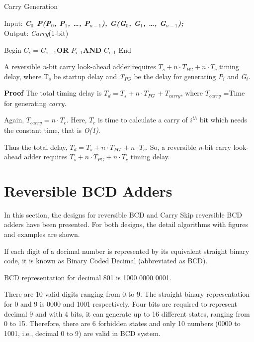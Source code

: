 \begin{algorithm}[!tbh]
	\caption{Carry Generation}
	\label{alg:part1_c2_alg5}
	Input: {\bf {\it C${}_{0,\ }$P(P${}_{0}$, P${}_{1}$, {\dots}, P${}_{n-1}$), G(G${}_{0}$, G${}_{1}$, {\dots}, G${}_{n-1}$);}}\\
	Output: {{ \textit{Carry}(1-bit)}}
	\begin{algorithmic}[1]
		\STATE Begin
		\STATE $C{}_{i}$ = $G{}_{i-1}${\bf OR} $P{}_{i\cdot 1}${\bf AND} $C{}_{i\cdot 1}$
		\ENDFOR
		\STATE End
	\end{algorithmic}
\end{algorithm}
\begin{property}\textnormal{
		A reversible {\it n}-bit carry look-ahead adder requires {$T{}_{s} + n \cdot T{}_{PG}+ n \cdot T{}_{c}$} timing delay, where T${}_{s}$ be startup delay and {\it T${}_{PG}$} be the delay for generating {\it P${}_{i}$} and {\it G${}_{i}$}.} 
\end{property}

\noindent\textbf{Proof}{
	The total timing delay is	
	{$T{}_{d} = T{}_{s}+n\cdot T{}_{PG\ }+T{}_{carry}$}, where {$T{}_{carry}$} =Time for generating {\it carry}.}

\textnormal{	
	Again, {$T{}_{carry} = n \cdot T{}_{c}$}. Here, {$T{}_{c}$} is time to calculate a carry of {$i{}^{th}$} bit which needs the constant time, that is {\it O(1)}.} 

\textnormal{	
	Thus the total delay, {$T{}_{d} = T{}_{s} + n \cdot T{}_{PG\ }+ n \cdot T{}_{c}$}. So, a reversible {\it n}-bit carry look-ahead adder requires {$T{}_{s} + n \cdot T{}_{PG} + n \cdot T{}_{c}$} timing delay.}


\section{Reversible BCD Adders}
In this section, the designs for reversible BCD and Carry Skip reversible BCD adders have been presented. For both designs, the detail algorithms with figures and examples are shown.
\begin{property}\textnormal{
		If each digit of a decimal number is represented by its equivalent straight binary code, it is known as Binary Coded Decimal (abbreviated as BCD).}
\end{property}
\begin{example}\textnormal{
		BCD representation for decimal 801 is 1000 0000 0001.}
	
	\textnormal{There are 10 valid digits ranging from 0 to 9. The straight binary representation for 0 and 9 is 0000 and 1001 respectively. Four bits are required to represent decimal 9 and with 4 bits, it can generate up to 16 different states, ranging from 0 to 15. Therefore, there are 6 forbidden states and only 10 numbers (0000 to 1001, i.e., decimal 0 to 9) are valid in BCD system.}
\end{example}

